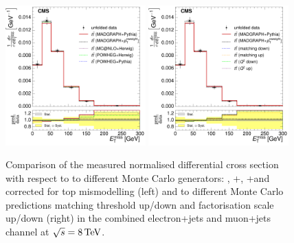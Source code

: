 \begin{figure}[hbtp]
    \centering
     \includegraphics[width=0.48\textwidth]{Chapters/04_Analysis/04b_XSections/images/results/8TeV/MET/central/normalised_xsection_combined_different_generators.pdf}\hfill
     \includegraphics[width=0.48\textwidth]{Chapters/04_Analysis/04b_XSections/images/results/8TeV/MET/central/normalised_xsection_combined_systematics_shifts.pdf}\hfill
     \caption{Comparison of the measured normalised differential cross section with respect to \met to
     different Monte Carlo generators: \MADGRAPH, \POWHEG+\HERWIG, \POWHEG+\PYTHIA and \MADGRAPH corrected for
     top \pt mismodelling (left) and to different Monte Carlo predictions matching threshold up/down and
     factorisation scale up/down (right) in the combined electron+jets and muon+jets channel at
     $\sqrt{s}=8\,\text{Te\hspace{-.08em}V}$.}
     \label{fig:result_MET_8TeV_combined}
\end{figure}

